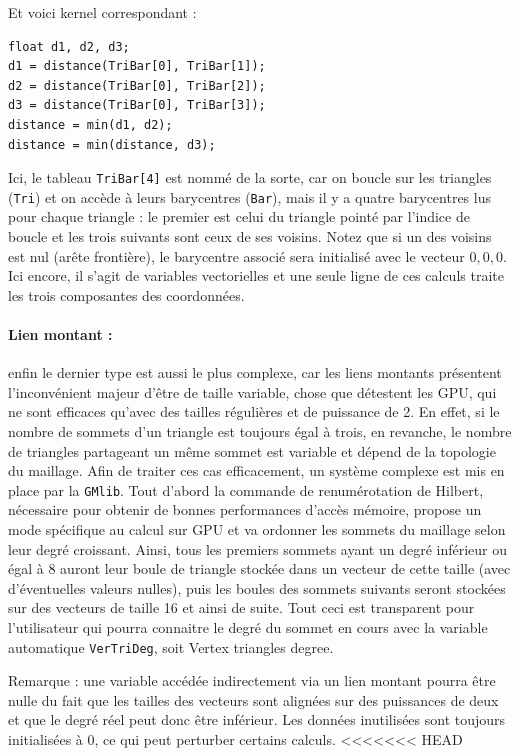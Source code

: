 \documentclass[a4paper,12pt]{article}
\begin{document}
Et voici kernel correspondant :

\begin{tt}
\begin{verbatim}
float d1, d2, d3;
d1 = distance(TriBar[0], TriBar[1]);
d2 = distance(TriBar[0], TriBar[2]);
d3 = distance(TriBar[0], TriBar[3]);
distance = min(d1, d2);
distance = min(distance, d3);
\end{verbatim}
\end{tt}
\normalfont

Ici, le tableau {\tt TriBar[4]} est nommé de la sorte, car on boucle sur les triangles ({\tt Tri}) et on accède à leurs barycentres ({\tt Bar}), mais il y a quatre barycentres lus pour chaque triangle : le premier est celui du triangle pointé par l'indice de boucle et les trois suivants sont ceux de ses voisins.
Notez que si un des voisins est nul (arête frontière), le barycentre associé sera initialisé avec le vecteur ${0,0,0}$.
Ici encore, il s'agit de variables vectorielles et une seule ligne de ces calculs traite les trois composantes des coordonnées.

\paragraph{Lien montant :} enfin le dernier type est aussi le plus complexe, car les liens montants présentent l'inconvénient majeur d'être de taille variable, chose que détestent les GPU, qui ne sont efficaces qu'avec des tailles régulières et de puissance de 2.
En effet, si le nombre de sommets d'un triangle est toujours égal à trois, en revanche, le nombre de triangles partageant un même sommet est variable et dépend de la topologie du maillage.
Afin de traiter ces cas efficacement, un système complexe est mis en place par la {\tt GMlib}.
Tout d'abord la commande de renumérotation de Hilbert, nécessaire pour obtenir de bonnes performances d'accès mémoire, propose un mode spécifique au calcul sur GPU et va ordonner les sommets du maillage selon leur degré croissant.
Ainsi, tous les premiers sommets ayant un degré inférieur ou égal à 8 auront leur boule de triangle stockée dans un vecteur de cette taille (avec d'éventuelles valeurs nulles), puis les boules des sommets suivants seront stockées sur des vecteurs de taille 16 et ainsi de suite.
Tout ceci est transparent pour l'utilisateur qui pourra connaitre le degré du sommet en cours avec la variable automatique {\tt VerTriDeg}, soit Vertex triangles degree.

Remarque : une variable accédée indirectement via un lien montant pourra être nulle du fait que les tailles des vecteurs sont alignées sur des puissances de deux et que le degré réel peut donc être inférieur. Les données inutilisées sont toujours initialisées à 0, ce qui peut perturber certains calculs.
<<<<<<< HEAD
\end{document}
